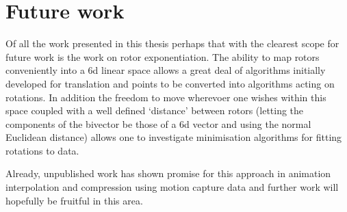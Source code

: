\section{Future work}

Of all the work presented in this thesis perhaps that with the clearest scope for
future work is the work on rotor exponentiation. The ability to map rotors conveniently
into a 6d linear space allows a great deal of algorithms initially developed for
translation and points to be converted into algorithms acting on rotations. In addition
the freedom to move wherevoer one wishes within this space coupled with a well defined 
`distance' between rotors (letting the components of the bivector be those of a 6d vector and
using the normal Euclidean distance) allows one to investigate minimisation algorithms for
fitting rotations to data.

Already, unpublished work has shown promise for this approach in animation interpolation
and compression using motion capture data and further work will hopefully be fruitful in this
area.
